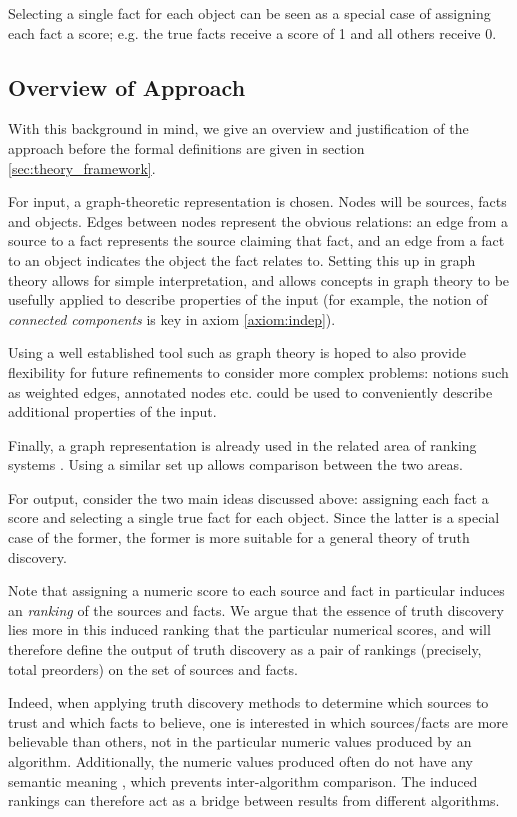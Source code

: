 \documentclass[../main.tex]{subfiles}
\begin{document}
Selecting a single fact for each object can be seen as a special case of
assigning each fact a score; e.g. the true facts receive a score of 1 and all
others receive 0.

\subsection{Overview of Approach}
\label{sec:theory_approach_overview}

With this background in mind, we give an overview and justification of the
approach before the formal definitions are given in section
\ref{sec:theory_framework}.

For input, a graph-theoretic representation is chosen. Nodes will be sources,
facts and objects. Edges between nodes represent the obvious relations: an edge
from a source to a fact represents the source claiming that fact, and an edge
from a fact to an object indicates the object the fact relates to. Setting this
up in graph theory allows for simple interpretation, and allows concepts in
graph theory to be usefully applied to describe properties of the input (for
example, the notion of \emph{connected components} is key in axiom
\ref{axiom:indep}).

Using a well established tool such as graph theory is hoped to also provide
flexibility for future refinements to consider more complex problems: notions
such as weighted edges, annotated nodes etc. could be used to conveniently
describe additional properties of the input.

Finally, a graph representation is already used in the related area of ranking
systems \cite{altman_foundations, altman_personalised}. Using a similar set up
allows comparison between the two areas.

For output, consider the two main ideas discussed above: assigning each fact a
score and selecting a single true fact for each object. Since the latter is a
special case of the former, the former is more suitable for a general theory of
truth discovery.

Note that assigning a numeric score to each source and fact in particular
induces an \emph{ranking} of the sources and facts. We argue that the essence
of truth discovery lies more in this induced ranking that the particular
numerical scores, and will therefore define the output of truth discovery as a
pair of rankings (precisely, total preorders) on the set of sources and facts.

Indeed, when applying truth discovery methods to determine which sources to
trust and which facts to believe, one is interested in which sources/facts are
more believable than others, not in the particular numeric values produced by
an algorithm. Additionally, the numeric values produced often do not have any
semantic meaning \cite{pasternack}, which prevents inter-algorithm comparison.
The induced rankings can therefore act as a bridge between results from
different algorithms.
\end{document}
